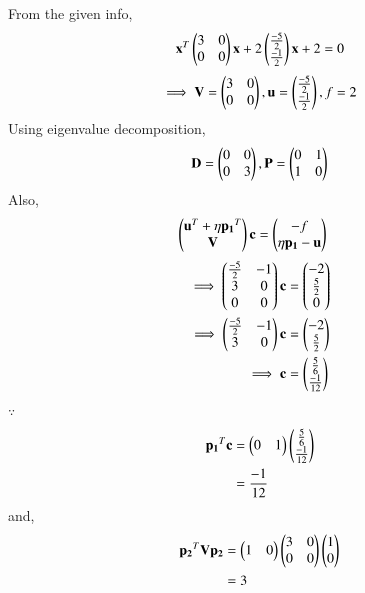 
%
\item From the given info, 
    \begin{align}
    \mathbf{x}^T \begin{pmatrix}3 & 0\\0 & 0\end{pmatrix}\mathbf{x}+ 2\begin{pmatrix}\frac{-5}{2} \\ \frac{-1}{2}\end{pmatrix}\mathbf{x}+2=0
\end{align}
    \begin{align}
    \implies     \mathbf{V} = \begin{pmatrix}3 & 0 \\ 0 & 0\end{pmatrix},\mathbf{u}=\begin{pmatrix}\frac{-5}{2} \\ \frac{-1}{2}\end{pmatrix},f=2
    \end{align}
     Using eigenvalue decomposition,
    \begin{align}
        \mathbf{D} = \begin{pmatrix}0 & 0\\0 & 3\end{pmatrix} ,\mathbf{P}=\begin{pmatrix}0 & 1\\1 & 0\end{pmatrix}
    \end{align}
Also, 
\begin{align}
    \begin{pmatrix}\mathbf{u}^T + \eta\mathbf{p_1}^T \\ \mathbf{V}\end{pmatrix}\mathbf{c} &= \begin{pmatrix}-f \\ \eta\mathbf{p_1}-\mathbf{u}\end{pmatrix} 
\end{align}
%
    \begin{align}
\implies         \begin{pmatrix}\frac{-5}{2} & -1 \\ 3 & 0 \\ 0 & 0\end{pmatrix}\mathbf{c} &= \begin{pmatrix}-2 \\ \frac{5}{2} \\ 0\end{pmatrix} \\
     \implies  \begin{pmatrix}\frac{-5}{2} & -1 \\ 3 & 0\end{pmatrix}\mathbf{c} &= \begin{pmatrix}-2 \\ \frac{5}{2}\end{pmatrix}
        \\
        \implies \mathbf{c} &= \begin{pmatrix}\frac{5}{6}\\\frac{-1}{12}\end{pmatrix}
    \end{align}
    $\because $
    \begin{align}
        \mathbf{p_1}^T\mathbf{c} &= \begin{pmatrix}0 & 1\end{pmatrix}\begin{pmatrix}\frac{5}{6}\\\frac{-1}{12}\end{pmatrix}
        \\
        &= \frac{-1}{12}
    \end{align}
    and,
    \begin{align}
        \mathbf{p_2}^T\mathbf{V}\mathbf{p_2} &= \begin{pmatrix}1 & 0\end{pmatrix}\begin{pmatrix}3 & 0\\0& 0\end{pmatrix}\begin{pmatrix}1 \\ 0\end{pmatrix}
        \\
        &= 3
    \end{align}

